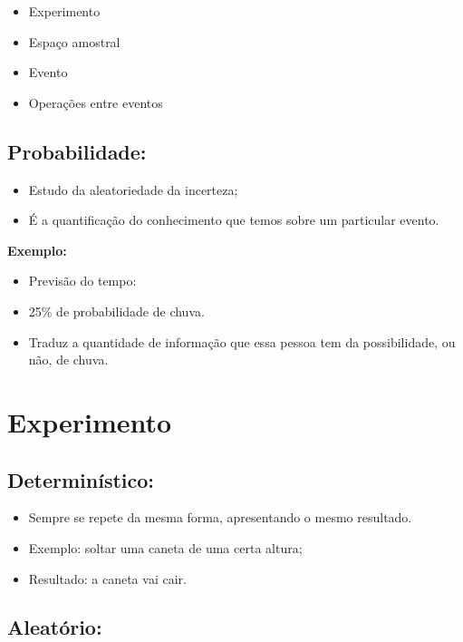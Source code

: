 \documentclass[
]{book}
\providecommand{\tightlist}{%
  \setlength{\itemsep}{0pt}\setlength{\parskip}{0pt}}
\begin{document}
\begin{itemize}
\item
  Experimento
\item
  Espaço amostral
\item
  Evento
\item
  Operações entre eventos
\end{itemize}

\hypertarget{probabilidade-1}{%
\subsection{Probabilidade:}\label{probabilidade-1}}

\begin{itemize}
\item
  Estudo da aleatoriedade da incerteza;
\item
  É a quantificação do conhecimento que temos sobre um particular evento.
\end{itemize}

\textbf{Exemplo:}

\begin{itemize}
\tightlist
\item
  Previsão do tempo:
\item
  25\% de probabilidade de chuva.
\item
  Traduz a quantidade de informação que essa pessoa tem da possibilidade, ou não, de chuva.
\end{itemize}

\hypertarget{experimento}{%
\section{Experimento}\label{experimento}}

\hypertarget{determinuxedstico}{%
\subsection{Determinístico:}\label{determinuxedstico}}

\begin{itemize}
\item
  Sempre se repete da mesma forma, apresentando o mesmo resultado.
\item
  Exemplo: soltar uma caneta de uma certa altura;
\item
  Resultado: a caneta vai cair.
\end{itemize}

\hypertarget{aleatuxf3rio}{%
\subsection{Aleatório:}\label{aleatuxf3rio}}
\end{document}
